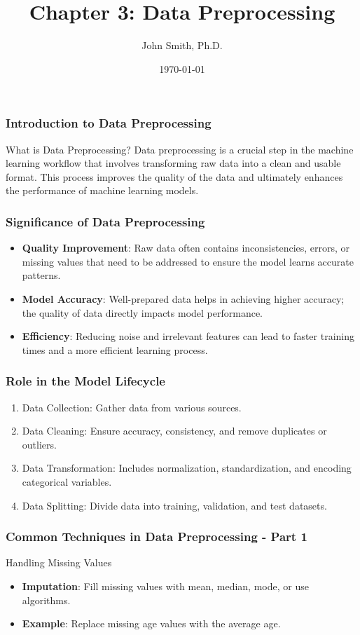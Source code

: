 \documentclass[aspectratio=169]{beamer}
\title[Data Preprocessing]{Chapter 3: Data Preprocessing}
\author[J. Smith]{John Smith, Ph.D.}
\institute[University Name]{
  Department of Computer Science\\
  University Name\\
  \vspace{0.3cm}
  Email: email@university.edu\\
  Website: www.university.edu
}
\date{\today}
\begin{document}
\frame{\titlepage}

\begin{frame}[fragile]
    \frametitle{Introduction to Data Preprocessing}
    \begin{block}{What is Data Preprocessing?}
        Data preprocessing is a crucial step in the machine learning workflow that involves transforming raw data into a clean and usable format. This process improves the quality of the data and ultimately enhances the performance of machine learning models.
    \end{block}
\end{frame}

\begin{frame}[fragile]
    \frametitle{Significance of Data Preprocessing}
    \begin{itemize}
        \item \textbf{Quality Improvement}: Raw data often contains inconsistencies, errors, or missing values that need to be addressed to ensure the model learns accurate patterns.
        \item \textbf{Model Accuracy}: Well-prepared data helps in achieving higher accuracy; the quality of data directly impacts model performance.
        \item \textbf{Efficiency}: Reducing noise and irrelevant features can lead to faster training times and a more efficient learning process.
    \end{itemize}
\end{frame}

\begin{frame}[fragile]
    \frametitle{Role in the Model Lifecycle}
    \begin{enumerate}
        \item Data Collection: Gather data from various sources.
        \item Data Cleaning: Ensure accuracy, consistency, and remove duplicates or outliers.
        \item Data Transformation: Includes normalization, standardization, and encoding categorical variables.
        \item Data Splitting: Divide data into training, validation, and test datasets.
    \end{enumerate}
\end{frame}

\begin{frame}[fragile]
    \frametitle{Common Techniques in Data Preprocessing - Part 1}
    \begin{block}{Handling Missing Values}
        \begin{itemize}
            \item \textbf{Imputation}: Fill missing values with mean, median, mode, or use algorithms.
            \item \textbf{Example}: Replace missing age values with the average age.
        \end{itemize}
    \end{block}
\end{frame}
\end{document}

